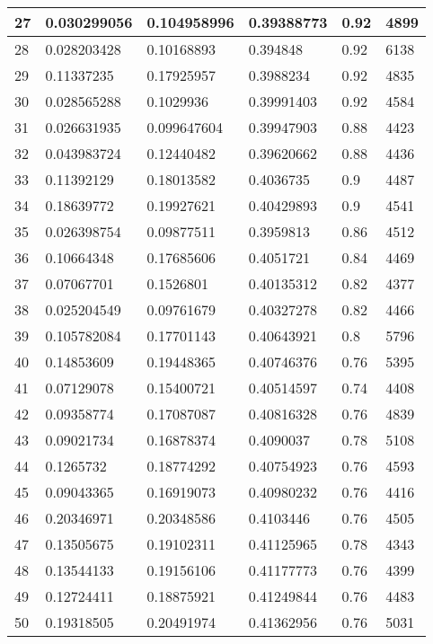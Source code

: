 \begin{longtable}{|l|l|l|l|l|l|}
27 & 0.030299056 & 0.104958996 & 0.39388773 & 0.92 & 4899 \\ \hline 
28 & 0.028203428 & 0.10168893 & 0.394848 & 0.92 & 6138 \\ \hline 
29 & 0.11337235 & 0.17925957 & 0.3988234 & 0.92 & 4835 \\ \hline 
30 & 0.028565288 & 0.1029936 & 0.39991403 & 0.92 & 4584 \\ \hline 
31 & 0.026631935 & 0.099647604 & 0.39947903 & 0.88 & 4423 \\ \hline 
32 & 0.043983724 & 0.12440482 & 0.39620662 & 0.88 & 4436 \\ \hline 
33 & 0.11392129 & 0.18013582 & 0.4036735 & 0.9 & 4487 \\ \hline 
34 & 0.18639772 & 0.19927621 & 0.40429893 & 0.9 & 4541 \\ \hline 
35 & 0.026398754 & 0.09877511 & 0.3959813 & 0.86 & 4512 \\ \hline 
36 & 0.10664348 & 0.17685606 & 0.4051721 & 0.84 & 4469 \\ \hline 
37 & 0.07067701 & 0.1526801 & 0.40135312 & 0.82 & 4377 \\ \hline 
38 & 0.025204549 & 0.09761679 & 0.40327278 & 0.82 & 4466 \\ \hline 
39 & 0.105782084 & 0.17701143 & 0.40643921 & 0.8 & 5796 \\ \hline 
40 & 0.14853609 & 0.19448365 & 0.40746376 & 0.76 & 5395 \\ \hline 
41 & 0.07129078 & 0.15400721 & 0.40514597 & 0.74 & 4408 \\ \hline 
42 & 0.09358774 & 0.17087087 & 0.40816328 & 0.76 & 4839 \\ \hline 
43 & 0.09021734 & 0.16878374 & 0.4090037 & 0.78 & 5108 \\ \hline 
44 & 0.1265732 & 0.18774292 & 0.40754923 & 0.76 & 4593 \\ \hline 
45 & 0.09043365 & 0.16919073 & 0.40980232 & 0.76 & 4416 \\ \hline 
46 & 0.20346971 & 0.20348586 & 0.4103446 & 0.76 & 4505 \\ \hline 
47 & 0.13505675 & 0.19102311 & 0.41125965 & 0.78 & 4343 \\ \hline 
48 & 0.13544133 & 0.19156106 & 0.41177773 & 0.76 & 4399 \\ \hline 
49 & 0.12724411 & 0.18875921 & 0.41249844 & 0.76 & 4483 \\ \hline 
50 & 0.19318505 & 0.20491974 & 0.41362956 & 0.76 & 5031 \\ \hline 
\end{longtable}